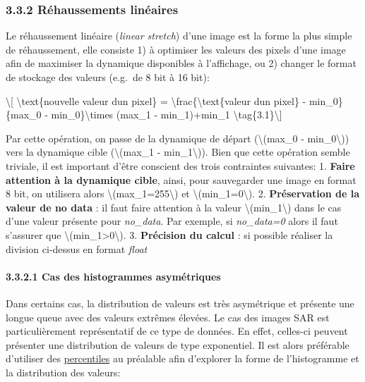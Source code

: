 \documentclass[
]{article}
\begin{document}
\subsubsection{\texorpdfstring{{3.3.2} Réhaussements
linéaires}{3.3.2 Réhaussements linéaires}}\label{ruxe9haussements-linuxe9aires}

Le réhaussement linéaire (\emph{linear stretch}) d'une image est la
forme la plus simple de réhaussement, elle consiste 1) à optimiser les
valeurs des pixels d'une image afin de maximiser la dynamique
disponibles à l'affichage, ou 2) changer le format de stockage des
valeurs (e.g.~de 8 bit à 16 bit):

\label{eq-rehauss-lin}{{\textbackslash{[}
\textbackslash text\{nouvelle valeur d\textquotesingle un pixel\} =
\textbackslash frac\{\textbackslash text\{valeur d\textquotesingle un
pixel\} - min\_0\}\{max\_0 - min\_0\}\textbackslash times (max\_1 -
min\_1)+min\_1 \textbackslash tag\{3.1\}\textbackslash{]}}}

Par cette opération, on passe de la dynamique de départ
({\textbackslash(max\_0 - min\_0\textbackslash)}) vers la dynamique
cible ({\textbackslash(max\_1 - min\_1\textbackslash)}). Bien que cette
opération semble triviale, il est important d'être conscient des trois
contraintes suivantes: 1. \textbf{Faire attention à la dynamique cible},
ainsi, pour sauvegarder une image en format 8 bit, on utilisera alors
{\textbackslash(max\_1=255\textbackslash)} et
{\textbackslash(min\_1=0\textbackslash)}. 2. \textbf{Préservation de la
valeur de no data} : il faut faire attention à la valeur
{\textbackslash(min\_1\textbackslash)} dans le cas d'une valeur présente
pour \emph{no\_data}. Par exemple, si \emph{no\_data=0} alors il faut
s'assurer que {\textbackslash(min\_1\textgreater0\textbackslash)}. 3.
\textbf{Précision du calcul} : si possible réaliser la division
ci-dessus en format \emph{float}

\paragraph{\texorpdfstring{{3.3.2.1} Cas des histogrammes
asymétriques}{3.3.2.1 Cas des histogrammes asymétriques}}\label{cas-des-histogrammes-asymuxe9triques}

Dans certains cas, la distribution de valeurs est très asymétrique et
présente une longue queue avec des valeurs extrêmes élevées. Le cas des
images SAR est particulièrement représentatif de ce type de données. En
effet, celles-ci peuvent présenter une distribution de valeurs de type
exponentiel. Il est alors préférable d'utiliser des
\href{https://fr.wikipedia.org/wiki/Centile}{percentiles} au préalable
afin d'explorer la forme de l'histogramme et la distribution des
valeurs:
\end{document}
